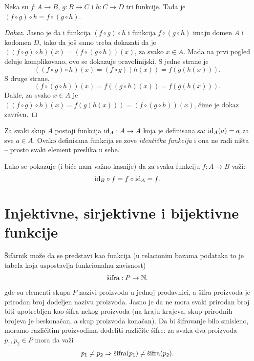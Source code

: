 \begin{THM}\label{ft08.thm.assoc}
  Neka su $f : A \to B$, $g : B \to C$ i $h : C \to D$ tri funkcije. Tada je $(f \circ g) \circ h = f \circ (g \circ h)$.
\end{THM}
\begin{proof}[Dokaz]
  Jasno je da i funkcija $(f \circ g) \circ h$ i funkcija $f \circ (g \circ h)$ imaju domen $A$ i kodomen $D$, tako da jo\v s
  samo treba dokazati da je $((f \circ g) \circ h)(x) = (f \circ (g \circ h))(x)$, za svako $x \in A$.
  Mada na prvi pogled deluje komplikovano, ovo se dokazuje pravolinijski. S jedne strane je
  $$
    ((f \circ g) \circ h)(x) = (f \circ g)(h(x)) = f(g(h(x))).
  $$
  S druge strane,
  $$
    (f \circ (g \circ h))(x) = f((g \circ h)(x)) = f(g(h(x))).
  $$
  Dakle, za svako $x \in A$ je $((f \circ g) \circ h)(x) = f(g(h(x))) = (f \circ (g \circ h))(x)$,
  \v cime je dokaz zavr\v sen.
\end{proof}

\begin{EX}\label{ft08.ex.id-A}
  Za svaki skup $A$ postoji funkcija $\mathrm{id}_A : A \to A$ koja je definisana sa: $\mathrm{id}_A(a) = a$ za sve $a \in A$.
  Ovako definisana funkcija se zove \emph{identi\v cka funkcija} i ona ne radi ni\v sta -- prosto svaki element preslika u sebe.
  \begin{center}
    
  \end{center}
  Lako se pokazuje (i bi\'ce nam va\v zno kasnije) da za svaku funkciju $f : A \to B$ va\v zi:
  $$
    \mathrm{id}_B \circ f = f \circ \mathrm{id}_A = f.
  $$
\end{EX}



\section{Injektivne, sirjektivne i bijektivne funkcije}

\v Sifarnik mo\v ze da se predstavi kao funkcija (u relacionim bazama podataka to je tabela koja uspostavlja
funkcionalnu zavisnost)
$$
  \hbox{\v sifra} : P \to \NN.
$$
gde su elementi skupa $P$ nazivi proizvoda u jednoj prodavnici, a
\v sifra proizvoda je prirodan broj dodeljen nazivu proizvoda.
Jasno je da ne mora svaki prirodan broj biti upotrebljen kao \v sifra nekog proizvoda
(na kraju krajeva, skup prirodnih brojeva je beskona\v can, a skup proizvoda kona\v can).
Da bi \v sifrovanje bilo smisleno, moramo razli\v citim proizvodima dodeliti razli\v cite \v sifre:
za svaka dva proizvoda $p_1, p_2 \in P$ mora da va\v zi
$$
    p_1 \ne p_2 \Rightarrow \hbox{\v sifra}(p_1) \ne \hbox{\v sifra}(p_2).
$$
\begin{center}
    
\end{center}


